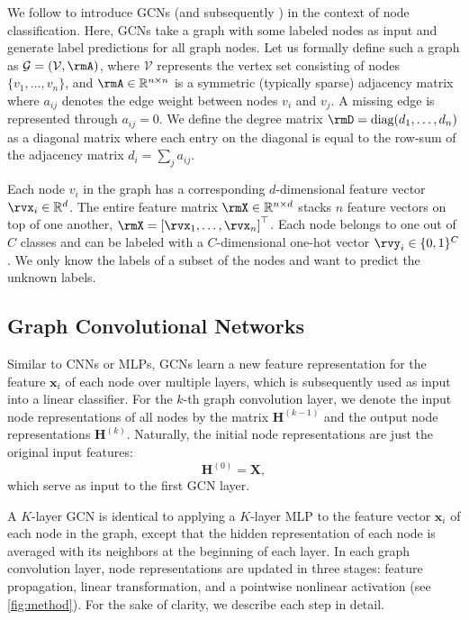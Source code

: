 We follow \citet{gcn} to introduce GCNs (and subsequently \method{}) in the context of node classification. Here, GCNs take a graph with some labeled nodes as input and generate label predictions for all graph nodes. Let us formally define such a graph as ${\mathcal{G}} = ({\mathcal{V}}, \rmA)$, where $\mathcal{V}$ represents the vertex set consisting of nodes $\{v_1, \dots, v_n\}$, and 
$\rmA\in\mathbb{R}^{n \times n}$ is a symmetric (typically sparse) adjacency matrix
where $a_{ij}$ denotes the edge weight between nodes $v_i$ and $v_j$. A missing edge is represented through $a_{ij} = 0$.
 We define the degree matrix $\rmD = \text{diag}(d_1, \dots, d_n)$ as a diagonal matrix where each entry on the diagonal is equal to the row-sum of the adjacency matrix $d_i =  \sum_j a_{ij}$. 


Each node $v_i$ in the graph has a corresponding $d$-dimensional feature vector $\rvx_i \in \mathbb{R}^{d}$. The entire feature matrix $\rmX \in \mathbb{R}^{n \times d}$ stacks $n$ feature vectors on top of one another, $\rmX=\left[\rvx_1,\dots,\rvx_n\right]^\top$. 
Each node belongs to one out of $C$ classes and can be labeled with a $C$-dimensional one-hot vector $\rvy_i\in\{0,1\}^C$.
We only know the labels of a subset of the nodes and want to predict the unknown labels.

\subsection{Graph Convolutional Networks}
Similar to CNNs or MLPs, GCNs  learn a new feature representation for the feature $\mathbf{x}_i$ of each node over multiple layers, which is subsequently used as input into a linear classifier.  For the $k$-th graph convolution layer, we denote the input node representations of all nodes by the matrix  $\mathbf{H}^{(k-1)}$ and the output node representations $\mathbf{H}^{(k)}$. Naturally, the initial node representations are just the original input features: 
%
\begin{equation} \label{eq:initial_feature}
    \mathbf{H}^{(0)} = \mathbf{X}, 
\end{equation}
%
which serve as input to the first GCN layer. 

A $K$-layer GCN is identical to applying a $K$-layer MLP to the feature vector $\mathbf{x}_i$ of each node in the graph, except that the hidden representation of each node is averaged with its neighbors at the beginning of each layer. In each graph convolution layer, node representations are updated in three stages: feature propagation, linear transformation, and a pointwise nonlinear activation (see \autoref{fig:method}). For the sake of clarity, we describe each step in detail. 


